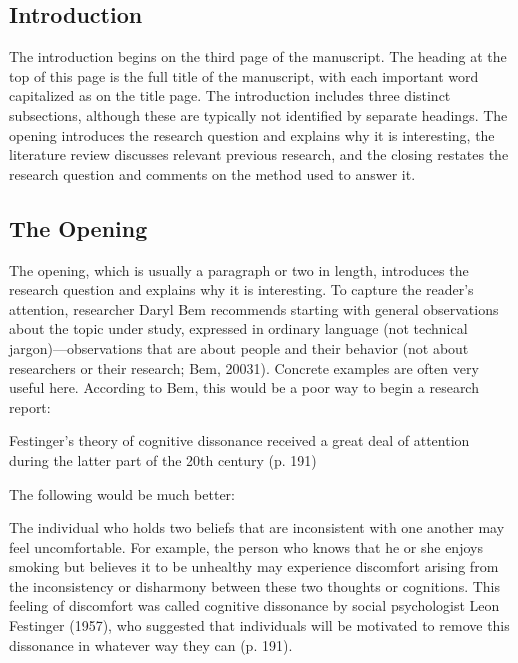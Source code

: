 \subsection{Introduction}

The introduction begins on the third page of the manuscript. The heading at the top of this page is the full title of the manuscript, with each important word capitalized as on the title page. The introduction includes three distinct subsections, although these are typically not identified by separate headings. The opening introduces the research question and explains why it is interesting, the literature review discusses relevant previous research, and the closing restates the research question and comments on the method used to answer it.


\subsection{The Opening}

The opening, which is usually a paragraph or two in length, introduces the research question and explains why it is interesting. To capture the reader's attention, researcher Daryl Bem recommends starting with general observations about the topic under study, expressed in ordinary language (not technical jargon)---observations that are about
people and their behavior (not about researchers or their research; Bem, 20031). Concrete examples are often very useful here. According to Bem, this would be a poor way to begin a research report:


\begin{kframe}
Festinger's theory of cognitive dissonance received a great deal of attention during the latter part of the 20th century (p. 191)
\end{kframe}


The following would be much better:


\begin{kframe}
The individual who holds two beliefs that are inconsistent with one another may feel uncomfortable. For example, the person who knows that he or she enjoys smoking but believes it to be unhealthy may experience discomfort arising from the inconsistency or disharmony between these two thoughts or cognitions. This feeling of discomfort was called cognitive dissonance by social psychologist Leon Festinger (1957), who suggested that individuals will be motivated to remove this dissonance in whatever way they can (p. 191).

\end{kframe}

